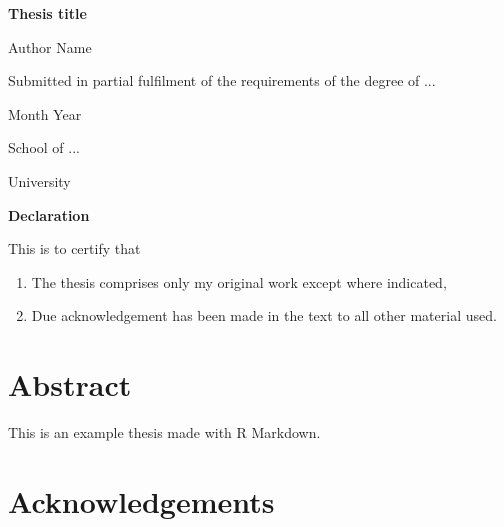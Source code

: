 \documentclass[
  12pt,
]{article}
\author{}
\date{\vspace{-2.5em}}
\providecommand{\tightlist}{%
  \setlength{\itemsep}{0pt}\setlength{\parskip}{0pt}}
\begin{document}

\begin{centering}

\vspace{3 cm}

\Huge

{\bf Thesis title}

\vspace{3 cm}

\Large
Author Name

\vspace{3 cm}


\normalsize
Submitted in partial fulfilment of the requirements of the degree of ...

Month Year

\vspace{3 cm}

\normalsize
School of ...

\normalsize
University

\end{centering}

\newpage

\textbf{Declaration}

This is to certify that

\begin{enumerate}
\def\labelenumi{\roman{enumi}.}
\tightlist
\item
  The thesis comprises only my original work except where indicated,
\item
  Due acknowledgement has been made in the text to all other material
  used.
\end{enumerate}

\newpage
\pagestyle{fancy}

\fancyhead[LE,RO]{}
\fancyhead[LO,RE]{}
\renewcommand{\headrulewidth}{0.4pt}
\renewcommand{\footrulewidth}{0pt}


\section*{Abstract}

This is an example thesis made with R Markdown.

\newpage
{}
\section*{Acknowledgements}
\end{document}
